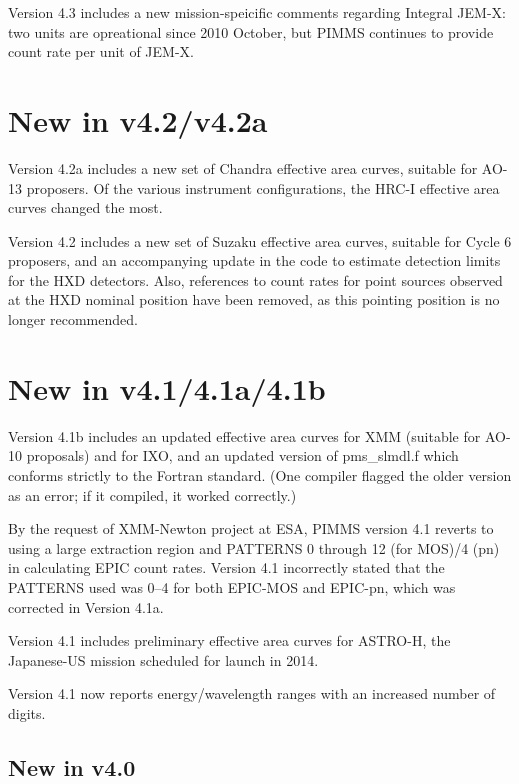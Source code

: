 Version 4.3 includes a new mission-speicific comments regarding Integral
JEM-X: two units are opreational since 2010 October, but PIMMS continues
to provide count rate per unit of JEM-X.

\section{New in v4.2/v4.2a}

Version 4.2a includes a new set of Chandra effective area curves, suitable
for AO-13 proposers.  Of the various instrument configurations, the HRC-I
effective area curves changed the most.

Version 4.2 includes a new set of Suzaku effective area curves, suitable
for Cycle 6 proposers, and an accompanying update in the code to estimate
detection limits for the HXD detectors.  Also, references to count rates
for point sources observed at the HXD nominal position have been removed,
as this pointing position is no longer recommended.

\section{New in v4.1/4.1a/4.1b}

Version 4.1b includes an updated effective area curves for XMM (suitable
for AO-10 proposals) and for IXO, and an updated version of pms\_slmdl.f
which conforms strictly to the Fortran standard.  (One compiler flagged
the older version as an error; if it compiled, it worked correctly.)

By the request of XMM-Newton project at ESA, PIMMS version 4.1 reverts
to using a large extraction region and PATTERNS 0 through 12 (for MOS)/4 (pn)
in calculating EPIC count rates.  Version 4.1 incorrectly stated that the
PATTERNS used was 0--4 for both EPIC-MOS and EPIC-pn, which was corrected
in Version 4.1a.

Version 4.1 includes preliminary effective area curves for ASTRO-H,
the Japanese-US mission scheduled for launch in 2014.

Version 4.1 now reports energy/wavelength ranges with an increased
number of digits.

\subsection{New in v4.0}

